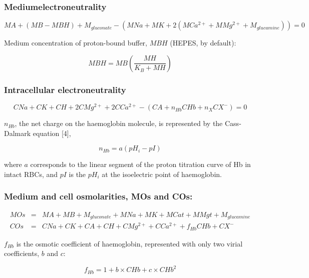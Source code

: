 \documentclass[a4paper]{article}
\newcommand{\med}[1]{M#1}
\newcommand{\cell}[1]{C#1}
\newcommand{\MA}{\med{A}}
\newcommand{\MB}{\med{B}}
\newcommand{\MBH}{\med{BH}}
\newcommand{\MGluca}{M_{glucamine}}
\newcommand{\MNa}{\med{Na}}
\newcommand{\MK}{\med{K}}
\newcommand{\MCatp}{\med{Ca^{2+}}}
\newcommand{\MMgtp}{\med{Mg^{2+}}}
\newcommand{\MGluco}{M_{gluconate}}
\newcommand{\MH}{\med{H}}
\newcommand{\MOs}{\med{Os}}
\newcommand{\MCat}{\med{Cat}}
\newcommand{\MMgt}{\med{Mgt}}
\newcommand{\KB}{K_B}
\newcommand{\CNa}{\cell{Na}}
\newcommand{\CK}{\cell{K}}
\newcommand{\CH}{\cell{H}}
\newcommand{\CMgtp}{\cell{Mg^{2+}}}
\newcommand{\CCatp}{\cell{Ca^{2+}}}
\newcommand{\CA}{\cell{A}}
\newcommand{\nHb}{n_{Hb}}
\newcommand{\CHb}{\cell{Hb}}
\newcommand{\nX}{n_{X}}
\newcommand{\CXm}{\cell{X^{-}}}
\newcommand{\COs}{\cell{Os}}
\newcommand{\pH}[1]{pH_{#1}}
\newcommand{\pI}{pI}
\newcommand{\fHb}{f_{Hb}}
\begin{document}
\subsubsection{Mediumelectroneutrality}\label{medium-electroneutrality}

\begin{equation}
\MA + (\MB - \MBH) + \MGluco-(\MNa + \MK + 2(\MCatp + \MMgtp + \MGluca)) = 0 \tag{1}
\end{equation}

Medium concentration of proton-bound buffer, $\MBH$ (HEPES, by default):

\begin{equation}
\MBH = \MB\left(\frac{\MH}{\KB + \MH}\right)
\end{equation}

\subsubsection{Intracellular electroneutrality}

\begin{equation}
\CNa + \CK + \CH + 2\CMgtp + 2\CCatp - (\CA + \nHb\CHb + \nX\CXm) = 0
\end{equation}

$\nHb$, the net charge on the haemoglobin molecule, is represented by the Cass-Dalmark equation [4],

\begin{equation}
\nHb=  a(\pH{i} - \pI)
\end{equation}

where $a$ corresponds to the linear segment of the proton titration curve of Hb in intact RBCs, and $\pI$ is the $\pH{i}$ at the isoelectric point of haemoglobin.

\subsubsection{Medium and cell osmolarities, MOs and COs:}

\begin{eqnarray}
	\MOs &=& \MA + \MB + \MGluco + \MNa + \MK + \MCat + \MMgt + \MGluca\\
	\COs &=& \CNa + \CK + \CA + \CH + \CMgtp + \CCatp  + \fHb\CHb + \CXm
\end{eqnarray}

$\fHb$ is the osmotic coefficient of haemoglobin, represented with only two virial coefficients, $b$ and $c$:

\begin{equation}
\fHb = 1 + b\times\CHb + c\times\CHb^2 
\end{equation}
\end{document}
